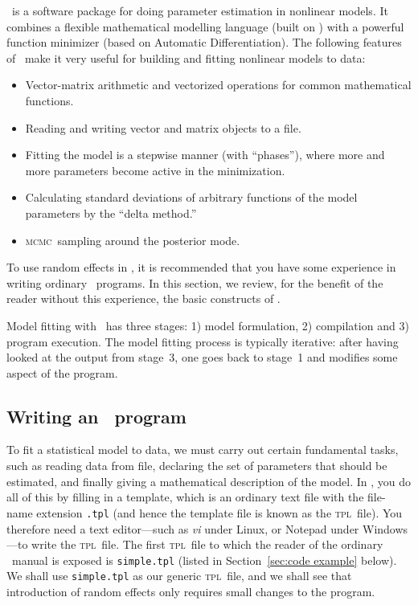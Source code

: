 \documentclass{admbmanual}
\newcommand{\scMCMC}{\textsc{mcmc}}
\begin{document}
\scAB\ is a software package for doing parameter estimation in nonlinear models.
It combines a flexible mathematical modelling language (built on \cplus) with a
powerful function minimizer (based on Automatic Differentiation). The following
features of \scAB\ make it very useful for building and fitting nonlinear models
to data:

\begin{itemize}
\item Vector-matrix arithmetic and vectorized operations for common mathematical
functions.
\item Reading and writing vector and matrix objects to a file.
\item Fitting the model is a stepwise manner (with ``phases''), where more and
more parameters become active in the minimization.
\item Calculating standard deviations of arbitrary functions of the model
parameters by the ``delta method.''
\item \scMCMC\ sampling around the posterior mode.
\end{itemize}
To use random effects in \scAB, it is recommended that you have some experience
in writing ordinary \scAB\ programs. In this section, we review, for the benefit
of the reader without this experience, the basic constructs of \scAB.

Model fitting with \scAB\ has three stages: 1) model formulation, 2) compilation
and 3) program execution. The model fitting process is typically iterative:
after having looked at the output from stage~3, one goes back to stage~1 and
modifies some aspect of the program.

\subsection{Writing an \scAB\ program}

To fit a statistical model to data, we must carry out certain fundamental tasks,
such as reading data from file, declaring the set of parameters that should be
estimated, and finally giving a mathematical description of the model. In \scAB,
you do all of this by filling in a template, which is an ordinary text file with
the file-name extension \texttt{.tpl} (and hence the template file is known as
the \textsc{tpl}~file). You therefore need a text editor---such as \textit{vi}
under Linux, or Notepad under Windows---to write the \textsc{tpl}~file. The
first \textsc{tpl}~file to which the reader of the ordinary \scAB\ manual is
exposed is \texttt{simple.tpl} (listed in Section~\ref{sec:code example} below).
We shall use \texttt{simple.tpl} as our generic \textsc{tpl}~file, and we shall
see that introduction of random effects only requires small changes to the
program.
\end{document}
